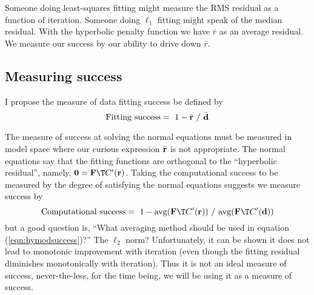 \par
Someone doing least-squares fitting might measure the RMS residual
as a function of iteration.
Someone doing $\ell_1$ fitting might speak of the median residual.
With the hyperbolic penalty function we have $\bar r$ as an average residual.
We measure our success by our ability to drive down $\bar r$.

\subsection{Measuring success}
I propose the measure of data fitting success be defined by
\begin{equation}
	{\rm Fitting~success} = \ 1 - \bar{\bold r}\ /\ \bar{\bold d}
\end{equation}
\par
The measure of success at solving the normal equations 
must be measured in model space
where our curious expression $\bar{\bold r}$ is not appropriate.
The normal equations say that the fitting functions are orthogonal
to the ``hyperbolic residual'', namely,
$\bold 0 = \bold F\T C'(\bold r)$.
Taking the computational success to be measured
by the degree of satisfying the normal equations
suggests we measure success by
\begin{equation}
{\rm Computational~success} =
\ 1 - {\rm avg}(\bold F\T C'(\bold r)) \ /\  {\rm avg}(\bold F\T C'(\bold d) )
\label{eqn:hymodsuccess}
\end{equation}
but a good question is,
``What averaging method should be used in equation (\ref{eqn:hymodsuccess})?''
The $\ell_2$ norm?
Unfortunately, it can be shown it does not lead to monotonic improvement with iteration
(even though the fitting residual diminishes monotonically with iteration).
Thus it is not an ideal measure of success,
never-the-less,
for the time being,
we will be using it as a measure of success.

